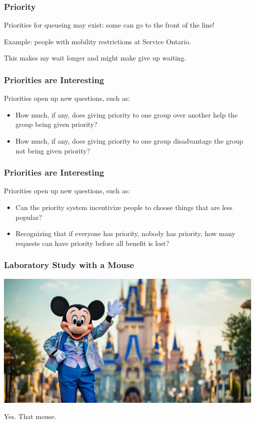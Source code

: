 \begin{frame}
\frametitle{Priority}

Priorities for queueing may exist: some can go to the front of the line!

Example: people with mobility restrictions at Service Ontario.

This makes my wait longer and might make give up waiting.

\end{frame}


\begin{frame}
\frametitle{Priorities are Interesting}

Priorities open up new questions, such as:

\begin{itemize}
	\item How much, if any, does giving priority to one group over another help the group being given priority? \vspace{3em}
	\item How much, if any, does giving priority to one group disadvantage the group not being given priority?
\end{itemize}

\end{frame}


\begin{frame}
\frametitle{Priorities are Interesting}

Priorities open up new questions, such as:

\begin{itemize}
	\item Can the priority system incentivize people to choose things that are less popular? \vspace{3em}
	\item Recognizing that if everyone has priority, nobody has priority, how many requests can have priority before all benefit is lost?
\end{itemize}

\end{frame}


\begin{frame}
\frametitle{Laboratory Study with a Mouse}

\begin{center}
	\includegraphics[width=\textwidth]{images/themouse.jpg}
\end{center}

Yes. That mouse.


\end{frame}


